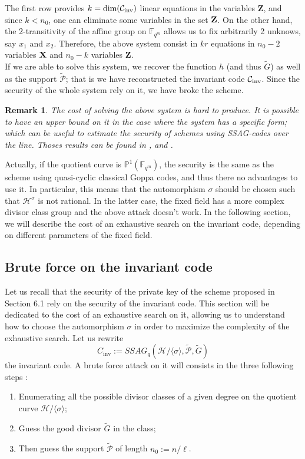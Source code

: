 \documentclass[10pt]{article}
\newtheorem{rq1}[thm]{Remark}
\newcommand{\s}{\vspace{0.3cm}}
\newcommand{\PP}{\mathbb{P}}
\newcommand{\fqm}{\mathbb{F}_{q^m}}
\newcommand{\PR}{\mathcal{P}}
\begin{document}
The first row provides $k=\rm dim(\mathcal{C}_{\rm{inv}})$ linear equations in the variables $\textbf{Z}$, and since $k < n_0$, one can eliminate some variables in the set $\bf{Z}$. On the other hand, the 2-transitivity of the affine group on $\fqm$ allows us to fix arbitrarily 2 unknows, say $x_1$ and $x_2$. Therefore, the above system consist in $kr$ equations in $n_0-2$ variables $\bf{X}$ and $n_0-k$ variables $\textbf{Z}$. \\
If we are able to solve this system, we recover the function $h$ (and thus $\tilde{G}$) as well as the support $\tilde{\PR}$; that is we have reconstructed the invariant code $\mathcal{C}_{\rm inv}$. Since the security of the whole system rely on it, we have broke the scheme.  

\s

\begin{rq1} \rm
The cost of solving the above system is hard to produce. It is possible to have an upper bound on it in the case where the system has a specific form; which can be useful to estimate the security of schemes using SSAG-codes over the line. Thoses results can be found in \cite{FOP}, \cite{FOP1} and \cite{FOP2}. 
\end{rq1}

Actually, if the quotient curve is $\PP^1(\fqm)$, the security is the same as the scheme using quasi-cyclic classical Goppa codes, and thus there no advantages to use it. In particular, this means that the automorphism $\sigma$ should be chosen such that $\mathcal{H}^{\sigma}$ is not rational. In the latter case, the fixed field has a more complex divisor class group and the above attack doesn't work. In the following section, we will describe the cost of an exhaustive search on the invariant code, depending on different parameters of the fixed field.

\s

\subsection{Brute force on the invariant code}

\s

Let us recall that the security of the private key of the scheme proposed in Section 6.1 rely on the security of the invariant code. This section will be dedicated to the cost of an exhaustive search on it, allowing us to understand how to choose the automorphism $\sigma$ in order to maximize the complexity of the exhaustive search. Let us rewrite 
\[C_{\mathrm{inv}} := SSAG_q\left(\mathcal{H}/\langle \sigma \rangle,\tilde{\PR},\tilde{G}\right)\]
the invariant code. A brute force attack on it will consists in the three following steps :
\begin{enumerate}
\item Enumerating all the possible divisor classes of a given degree on the quotient curve $\mathcal{H}/\langle \sigma \rangle$;
\item Guess the good divisor $\tilde{G}$ in the class;
\item Then guess the support $\tilde{\PR}$ of length $n_0:=n/\ell$.
\end{enumerate}
\end{document}
